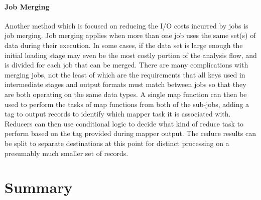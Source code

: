 \paragraph{Job Merging}
Another method which is focused on reducing the I/O costs incurred by jobs is job merging. Job merging applies when more than one job uses the same set(s) of data during their execution. In some cases, if the data set is large enough the initial loading stage may even be the most costly portion of the analysis flow, and is divided for each job that can be merged. There are many complications with merging jobs, not the least of which are the requirements that all keys used in intermediate stages and output formats must match between jobs so that they are both operating on the same data types. A single map function can then be used to perform the tasks of map functions from both of the sub-jobs, adding a tag to output records to identify which mapper task it is associated with. Reducers can then use conditional logic to decide what kind of reduce task to perform based on the tag provided during mapper output. The reduce results can be split to separate destinations at this point for distinct processing on a presumably much smaller set of records.

\section{Summary}
\label{sec:pattern_summary}
  

